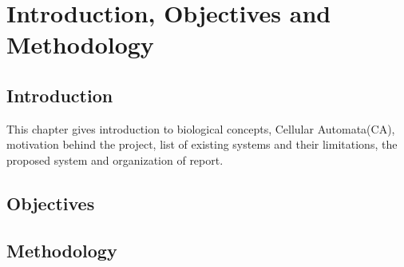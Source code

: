 \chapter{Introduction, Objectives and Methodology}

\section{Introduction}
This chapter gives introduction to biological concepts, Cellular Automata(CA), motivation behind the project, 
list of existing systems and their limitations, 
the proposed system and organization of report.~\cite{MolecularBiologyOfTheCell}~\cite{FiniteStateMachine}
\lipsum[1-1]

\section{Objectives}
\lipsum[2-2]

\section{Methodology}
\lipsum[3-3]